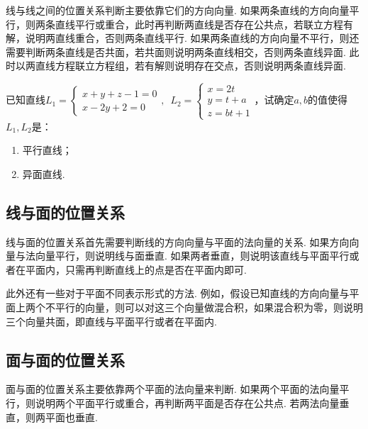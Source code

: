 线与线之间的位置关系判断主要依靠它们的方向向量. 如果两条直线的方向向量平行，则两条直线平行或重合，此时再判断两直线是否存在公共点，若联立方程有解，说明两直线重合，否则两条直线平行. 如果两条直线的方向向量不平行，则还需要判断两条直线是否共面，若共面则说明两条直线相交，否则两条直线异面. 此时以两直线方程联立方程组，若有解则说明存在交点，否则说明两条直线异面.

\begin{example}{}{}
    已知直线$L_1=\begin{cases}
            x+y+z-1=0 \\
            x-2y+2=0
        \end{cases},\enspace L_2=\begin{cases}
            x=2t  \\
            y=t+a \\
            z=bt+1
        \end{cases}$，试确定$a,b$的值使得$L_1,L_2$是：
    \begin{enumerate}
        \item 平行直线；

        \item 异面直线.
    \end{enumerate}
\end{example}

\subsection{线与面的位置关系}

线与面的位置关系首先需要判断线的方向向量与平面的法向量的关系. 如果方向向量与法向量平行，则说明线与面垂直. 如果两者垂直，则说明该直线与平面平行或者在平面内，只需再判断直线上的点是否在平面内即可.

此外还有一些对于平面不同表示形式的方法. 例如，假设已知直线的方向向量与平面上两个不平行的向量，则可以对这三个向量做混合积，如果混合积为零，则说明三个向量共面，即直线与平面平行或者在平面内.

\subsection{面与面的位置关系}

面与面的位置关系主要依靠两个平面的法向量来判断. 如果两个平面的法向量平行，则说明两个平面平行或重合，再判断两平面是否存在公共点. 若两法向量垂直，则两平面也垂直.

